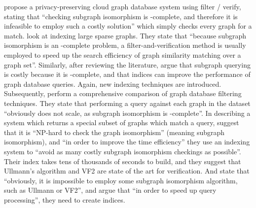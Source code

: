 \documentclass[twoside,11pt]{article}
\newcommand{\citet}[1]{\citeA{#1}}
\begin{document}
\citet{DBLP:conf/icdcs/CaoYWRL11} propose a privacy-preserving cloud graph database system using
filter / verify, stating that ``checking subgraph isomorphism is \NP-complete, and therefore it is
infeasible to employ such a costly solution'' which simply checks every graph for a match.
\citet{DBLP:journals/tkde/WangWYY12} look at indexing large sparse graphs. They state that ``because
subgraph isomorphism is an \NP-complete problem, a filter-and-verification method is usually
employed to speed up the search efficiency of graph similarity matching over a graph set''.
Similarly, after reviewing the literature, \citet{DBLP:journals/vldb/YuanM13} argue that subgraph
querying is costly because it is \NP-complete, and that indices can improve the performance of graph
database queries. Again, new indexing techniques are introduced. Subsequently, \citet{DBLP:journals/pvldb/KatsarouNT15} perform a comprehensive comparison of graph database
filtering techniques. They state that performing a query against each graph in the dataset
``obviously does not scale, as subgraph isomorphism is \NP-complete''. In describing a system which
returns a special subset of graphs which match a query, \citet{DBLP:journals/tkde/ZhengLZHZ16}
suggest that it is ``NP-hard to check the graph isomorphism'' (meaning subgraph isomorphism), and
``in order to improve the time efficiency'' they use an indexing system to ``avoid as many costly
subgraph isomorphism checkings as possible''. Their index takes tens of thousands of seconds to
build, and they suggest that Ullmann's algorithm and VF2 are state of the art for verification.
And \citet{DBLP:journals/www/PengZ0LZ16} state that ``obviously, it is impossible to employ some
subgraph isomorphism algorithm, such as Ullmann or VF2'', and argue that ``in order to speed up
query processing'', they need to create indices.
\end{document}
